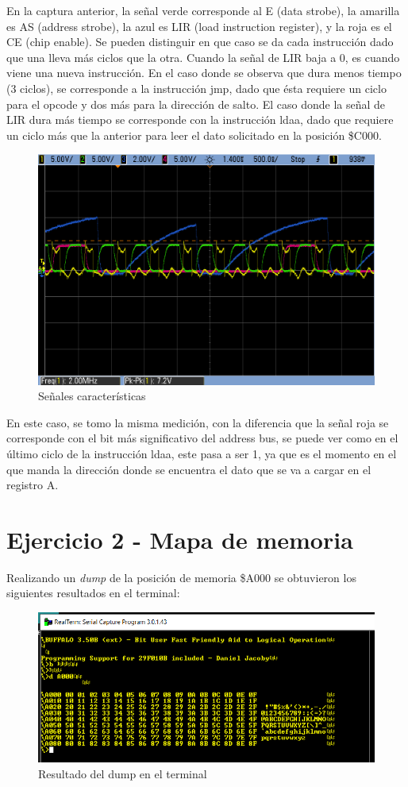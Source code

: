 \documentclass{article}
\begin{document}
En la captura anterior, la señal verde corresponde al E (data strobe), la amarilla es AS (address strobe), la azul es LIR (load instruction register), y la roja es el CE (chip enable).
Se pueden distinguir en que caso se da cada instrucción dado que una lleva más ciclos que la otra.
Cuando la señal de LIR baja a 0, es cuando viene una nueva instrucción. En el caso donde se observa que dura menos tiempo (3 ciclos), se corresponde a la instrucción jmp, dado que ésta requiere un ciclo para el opcode y dos más para la dirección de salto. El caso donde la señal de LIR dura más tiempo se corresponde con la instrucción ldaa, dado que requiere un ciclo más que la anterior para leer el dato solicitado en la posición \$C000.

\begin{figure}[ht]
	\centering
	\includegraphics[width=0.7 \textwidth]
	{../Ej1/guia1_11.png}
	\caption{Señales características}
	\label{fig:ej11}
\end{figure}

En este caso, se tomo la misma medición, con la diferencia que la señal roja se corresponde con el bit más significativo del address bus, se puede ver como en el último ciclo de la instrucción ldaa, este pasa a ser 1, ya que es el momento en el que manda la dirección donde se encuentra el dato que se va a cargar en el registro A.

\newpage

\section*{Ejercicio 2 - Mapa de memoria}

Realizando un \textit{dump} de la posición de memoria \$A000 se obtuvieron los siguientes resultados en el terminal:

\begin{figure}[ht]
	\centering
	\includegraphics[width=0.8 \textwidth]
	{../Ej2/guia1_2.png}
	\caption{Resultado del dump en el terminal}
	\label{fig:ej2}
\end{figure}
\end{document}

